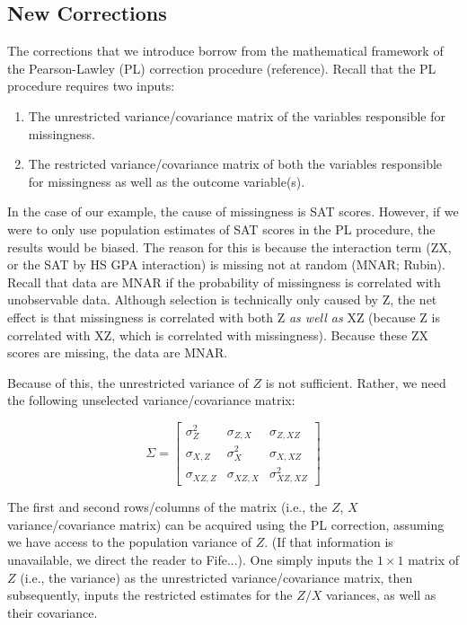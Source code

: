 \documentclass[man, babel,english]{apa}%
\begin{document}
\subsection{New Corrections}

The corrections that we introduce borrow from the mathematical framework of the Pearson-Lawley (PL) correction procedure (reference). Recall that the PL procedure requires two inputs:

\begin{enumerate}
\item The unrestricted variance/covariance matrix of the variables responsible for missingness.
\item The restricted variance/covariance matrix of both the variables responsible for missingness as well as the outcome variable(s). 
\end{enumerate}

In the case of our example, the cause of missingness is SAT scores. However, if we were to only use population estimates of SAT scores in the PL procedure, the results would be biased. The reason for this is because the interaction term (ZX, or the SAT by HS GPA interaction) is missing not at random (MNAR; Rubin). Recall that data are MNAR if the probability of missingness is correlated with unobservable data. Although selection is technically only caused by Z, the net effect is that missingness is correlated with both Z \emph{as well as} XZ (because Z is correlated with XZ, which is correlated with missingness). Because these ZX scores are missing, the data are MNAR. 

Because of this, the unrestricted variance of $Z$ is not sufficient. Rather, we need the following unselected variance/covariance matrix:


 \[
   \Sigma=
  \left[ {\begin{array}{ccc}
   \sigma^2_Z & \sigma_{Z,X} & \sigma_{Z,XZ} \\
	\sigma_{X,Z} & \sigma^2_X & \sigma_{X,XZ} \\
	\sigma_{XZ,Z} &\sigma_{XZ,X} & \sigma^2_{XZ,XZ}
  \end{array} } \right]
\]
\label{eq:matrix}


The first and second rows/columns of the matrix (i.e., the $Z$, $X$ variance/covariance matrix) can be acquired using the PL correction, assuming we have access to the population variance of $Z$. (If that information is unavailable, we direct the reader to Fife...). One simply inputs the $1\times1$ matrix of $Z$ (i.e., the variance) as the unrestricted variance/covariance matrix, then subsequently, inputs the restricted estimates for the $Z/X$ variances, as well as their covariance. 
\end{document}
